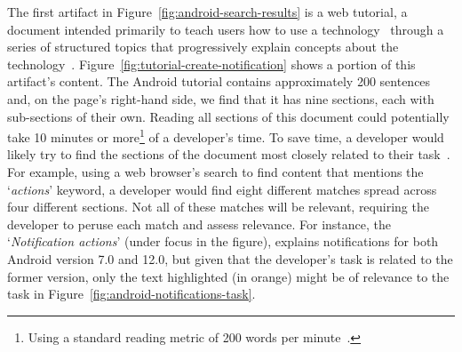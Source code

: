 


The first artifact in Figure~\ref{fig:android-search-results}
is a 
 web tutorial, a document intended primarily to teach users how to use 
a technology~\cite{arya2020} through a series of structured topics 
that progressively explain concepts about the technology~\cite{Jiang2016b, Jiang2017}. 
Figure~\ref{fig:tutorial-create-notification} 
shows a portion of this artifact's content. 
The Android tutorial contains  approximately 200 sentences
and, on the page's right-hand side, we find that 
it
has nine sections, each with sub-sections of their own. 
Reading all sections of this document could potentially 
take 10 minutes or more\footnote{Using a standard reading metric of 200 words per minute~\cite{Just1980}.} of a developer's time.
To save time, a developer would likely try to find the sections of the document
most closely related to their task~\cite{Li2013}.
For example, using a web browser's search to find content that mentions the `\textit{actions}' keyword, 
a developer would find eight different matches spread across four different sections.
Not all of these matches will be relevant, requiring the developer to peruse each
match and assess relevance. 
For instance, the `\textit{Notification actions}'
 (under focus in the figure), 
explains 
notifications for both Android version 7.0 and 12.0, 
 but given that the developer's task is related to the former version,
only the text highlighted (in orange)
might be of relevance to the task in Figure~\ref{fig:android-notifications-task}.






